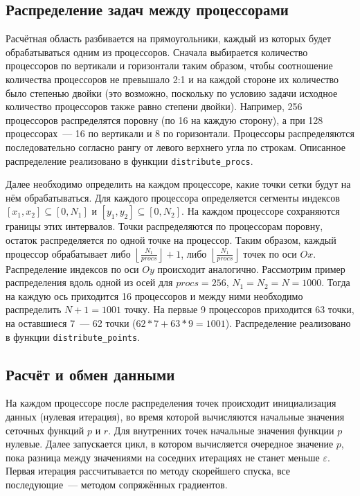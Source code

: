 \documentclass[11pt]{article}
\numberwithin{equation}{section}
\theoremstyle{plain}
\theoremstyle{definition}
\begin{document}
\subsection{Распределение задач между процессорами}
Расчётная область разбивается на прямоугольники, каждый из которых будет
обрабатываться одним из процессоров. Сначала выбирается количество
процессоров по вертикали и горизонтали таким образом, чтобы соотношение
количества процессоров не превышало 2:1 и на каждой стороне их количество
было степенью двойки (это возможно, поскольку по условию задачи исходное
количество процессоров также равно степени двойки). Например, 256 процессоров
распределятся поровну (по 16 на каждую сторону), а при 128 процессорах~---
16 по вертикали и 8 по горизонтали.
Процессоры распределяются последовательно согласно рангу от левого верхнего угла по строкам.
Описанное распределение реализовано в функции \verb|distribute_procs|.

Далее необходимо определить на каждом процессоре, какие точки сетки будут на
нём обрабатываться. Для каждого процессора определяется сегменты индексов
$[x_1, x_2] \subseteq [0, N_1]$ и $[y_1, y_2] \subseteq [0, N_2]$.
На каждом процессоре сохраняются границы этих интервалов.
Точки распределяются по процессорам поровну, остаток распределяется по
одной точке на процессор. Таким образом, каждый процессор
обрабатывает
либо $\left \lfloor \frac{N_1}{procs} \right \rfloor + 1$, либо
$\left \lfloor \frac{N_1}{procs} \right \rfloor$ точек по оси $Ox$.
Распределение индексов по оси $Oy$ происходит аналогично.
Рассмотрим пример распределения вдоль одной из
осей для $procs = 256$, $N_1 = N_2 = N = 1000$. Тогда на каждую ось приходится 16 процессоров
и между ними необходимо распределить $N + 1 = 1001$ точку. На первые 9
процессоров приходится 63 точки, на оставшиеся 7~--- 62 точки ($62*7 + 63*9 = 1001$).
Распределение реализовано в функции \verb|distribute_points|.

\subsection{Расчёт и обмен данными}

На каждом процессоре после распределения точек происходит инициализация
данных (нулевая итерация), во время которой вычисляются начальные значения
сеточных функций $p$ и $r$. Для внутренних точек начальные значения функции $p$
нулевые. Далее запускается цикл, в котором вычисляется
очередное значение $p$, пока разница между значениями на соседних итерациях
не станет меньше $\varepsilon$. Первая итерация рассчитывается по методу
скорейшего спуска, все последующие~--- методом сопряжённых градиентов.
\end{document}
